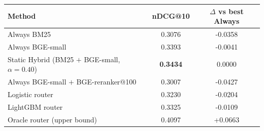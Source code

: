 \begin{tabular}{lSS}
\toprule
\textbf{Method} & \textbf{nDCG@10} & \textbf{$\Delta$ vs best Always} \\
\midrule
Always BM25 & 0.3076 & -0.0358 \\
Always BGE-small & 0.3393 & -0.0041 \\
Static Hybrid (BM25 $+$ BGE-small, $\alpha\!=\!0.40$) & \textbf{0.3434} & 0.0000 \\
Always BGE-small $+$ BGE-reranker@100 & 0.3007 & -0.0427 \\
\midrule
Logistic router & 0.3230 & -0.0204 \\
LightGBM router & 0.3325 & -0.0109 \\
\midrule
Oracle router (upper bound) & 0.4097 & +0.0663 \\
\bottomrule
\end{tabular}
